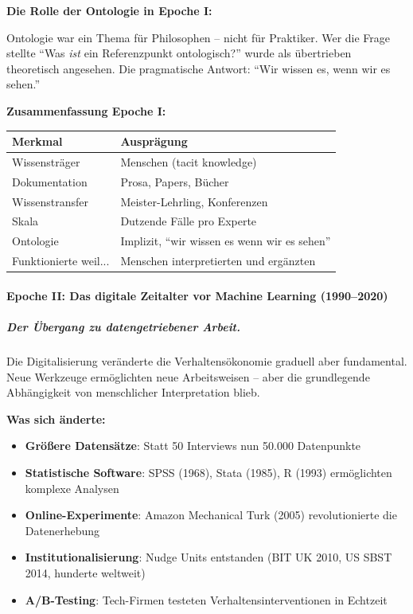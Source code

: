 \textbf{Die Rolle der Ontologie in Epoche I:}

Ontologie war ein Thema für Philosophen -- nicht für Praktiker. Wer die Frage stellte ``Was \textit{ist} ein Referenzpunkt ontologisch?'' wurde als übertrieben theoretisch angesehen. Die pragmatische Antwort: ``Wir wissen es, wenn wir es sehen.''

\textbf{Zusammenfassung Epoche I:}
\begin{table}[h]
\centering
\begin{tabular}{@{}ll@{}}
\toprule
\textbf{Merkmal} & \textbf{Ausprägung} \\
\midrule
Wissensträger & Menschen (tacit knowledge) \\
Dokumentation & Prosa, Papers, Bücher \\
Wissenstransfer & Meister-Lehrling, Konferenzen \\
Skala & Dutzende Fälle pro Experte \\
Ontologie & Implizit, ``wir wissen es wenn wir es sehen'' \\
Funktionierte weil... & Menschen interpretierten und ergänzten \\
\bottomrule
\end{tabular}
\end{table}

\paragraph{Epoche II: Das digitale Zeitalter vor Machine Learning (1990--2020)}

\subparagraph{Der Übergang zu datengetriebener Arbeit.}

Die Digitalisierung veränderte die Verhaltensökonomie graduell aber fundamental. Neue Werkzeuge ermöglichten neue Arbeitsweisen -- aber die grundlegende Abhängigkeit von menschlicher Interpretation blieb.

\textbf{Was sich änderte:}
\begin{itemize}
    \item \textbf{Größere Datensätze}: Statt 50 Interviews nun 50.000 Datenpunkte
    \item \textbf{Statistische Software}: SPSS (1968), Stata (1985), R (1993) ermöglichten komplexe Analysen
    \item \textbf{Online-Experimente}: Amazon Mechanical Turk (2005) revolutionierte die Datenerhebung
    \item \textbf{Institutionalisierung}: Nudge Units entstanden (BIT UK 2010, US SBST 2014, hunderte weltweit)
    \item \textbf{A/B-Testing}: Tech-Firmen testeten Verhaltensinterventionen in Echtzeit
\end{itemize}

